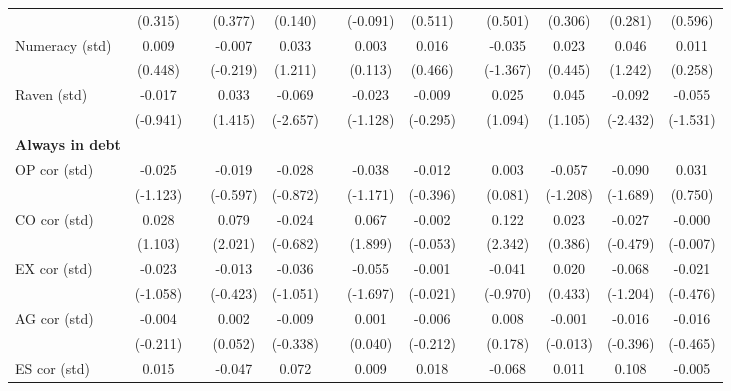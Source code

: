 \begin{table}[htbp]
{\begin{tabular}{lcccccccccccc}
          & (0.315) &       & (0.377) & (0.140) &       & (-0.091) & (0.511) &       & (0.501) & (0.306) & (0.281) & (0.596) \\
    Numeracy (std) & 0.009 &       & -0.007 & 0.033 &       & 0.003 & 0.016 &       & -0.035 & 0.023 & 0.046 & 0.011 \\
          & (0.448) &       & (-0.219) & (1.211) &       & (0.113) & (0.466) &       & (-1.367) & (0.445) & (1.242) & (0.258) \\
    Raven (std) & -0.017 &       & 0.033 & \cellcolor[rgb]{ 1,  1,  0}-0.069 &       & -0.023 & -0.009 &       & 0.025 & 0.045 & \cellcolor[rgb]{ 1,  1,  0}-0.092 & -0.055 \\
          & (-0.941) &       & (1.415) & (-2.657) &       & (-1.128) & (-0.295) &       & (1.094) & (1.105) & (-2.432) & (-1.531) \\
    \midrule
    \textbf{Always in debt} &       &       &       &       &       &       &       &       &       &       &       &  \\
    OP cor (std) & -0.025 &       & -0.019 & -0.028 &       & -0.038 & -0.012 &       & 0.003 & -0.057 & \cellcolor[rgb]{ 1,  1,  0}-0.090 & 0.031 \\
          & (-1.123) &       & (-0.597) & (-0.872) &       & (-1.171) & (-0.396) &       & (0.081) & (-1.208) & (-1.689) & (0.750) \\
    CO cor (std) & 0.028 &       & \cellcolor[rgb]{ 1,  1,  0}0.079 & -0.024 &       & \cellcolor[rgb]{ 1,  1,  0}0.067 & -0.002 &       & \cellcolor[rgb]{ 1,  1,  0}0.122 & 0.023 & -0.027 & -0.000 \\
          & (1.103) &       & (2.021) & (-0.682) &       & (1.899) & (-0.053) &       & (2.342) & (0.386) & (-0.479) & (-0.007) \\
    EX cor (std) & -0.023 &       & -0.013 & -0.036 &       & \cellcolor[rgb]{ 1,  1,  0}-0.055 & -0.001 &       & -0.041 & 0.020 & -0.068 & -0.021 \\
          & (-1.058) &       & (-0.423) & (-1.051) &       & (-1.697) & (-0.021) &       & (-0.970) & (0.433) & (-1.204) & (-0.476) \\
    AG cor (std) & -0.004 &       & 0.002 & -0.009 &       & 0.001 & -0.006 &       & 0.008 & -0.001 & -0.016 & -0.016 \\
          & (-0.211) &       & (0.052) & (-0.338) &       & (0.040) & (-0.212) &       & (0.178) & (-0.013) & (-0.396) & (-0.465) \\
    ES cor (std) & 0.015 &       & -0.047 & \cellcolor[rgb]{ 1,  1,  0}0.072 &       & 0.009 & 0.018 &       & -0.068 & 0.011 & \cellcolor[rgb]{ 1,  1,  0}0.108 & -0.005 \\

\end{tabular}}
\end{table}

